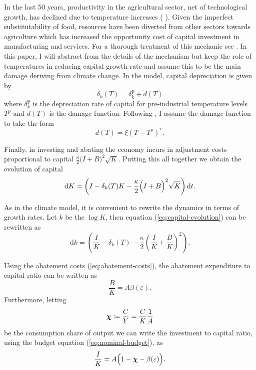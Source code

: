 \documentclass[../../main.tex]{subfiles}
\begin{document}
In the last 50 years, productivity in the agricultural sector, net of technological growth, has declined due to temperature increases (\citeauthor{dell_temperature_2009} \citeyear{dell_temperature_2009}). Given the imperfect substitutability of food, resources have been diverted from other sectors towards agricolture which has increased the opportunity cost of capital investment in manufacturing and services. For a thorough treatment of this mechanic see . In this paper, I will abstract from the details of the mechanism but keep the role of temperatures in reducing capital growth rate and assume this to be the main damage deriving from climate change. In the model, capital depreciation is given by \begin{equation}
    \delta_k(T) = \delta^{\mathrm{p}}_k +  d(T)
\end{equation} where $\delta^{\mathrm{p}}_k$ is the depreciation rate of capital for pre-industrial temperature levels $T^p$ and $d(T)$ is the damage function. Following , I assume the damage function to take the form \begin{equation}
    d(T) = \xi (T - T^p)^{\upsilon}.
\end{equation}

Finally, in investing and abating the economy incurs in adjustment costs proportional to capital $\frac{\kappa}{2} \big(I + B \big)^2 \sqrt{K}$. Putting this all together we obtain the evolution of capital \begin{equation} \label{eq:capital-evolution}
    \mathrm{d}K = \left( I - \delta_k(T) K - \frac{\kappa}{2} \Big(I + B\Big)^2 \sqrt{K} \right) \mathrm{d}t.
\end{equation} 

As in the climate model, it is convenient to rewrite the dynamics in terms of growth rates. Let $k$ be the $\log K$, then equation (\ref{eq:capital-evolution}) can be rewritten as \begin{equation} \label{eq:capital-evolution:log:level}
    \text{d}k = \left( \frac{I}{K} - \delta_k(T) - \frac{\kappa}{2} \left(\frac{I}{K} + \frac{B}{K}\right)^2 \right).
\end{equation}

Using the abatement costs (\ref{eq:abatement-costs}), the abatement expenditure to capital ratio can be written as \begin{equation}
    \frac{B}{K} = A \beta(\varepsilon).
\end{equation} Furthermore, letting \begin{equation}
    \bm{\chi} \coloneqq \frac{C}{Y} = \frac{C}{K} \frac{1}{A}
\end{equation} be the consumption share of output we can write the investment to capital ratio, using the budget equation (\ref{eq:nominal-budget}), as \begin{equation}
    \frac{I}{K} = A \Big(1 - \bm{\chi} - \beta(\varepsilon)\Big).
\end{equation}
\end{document}
